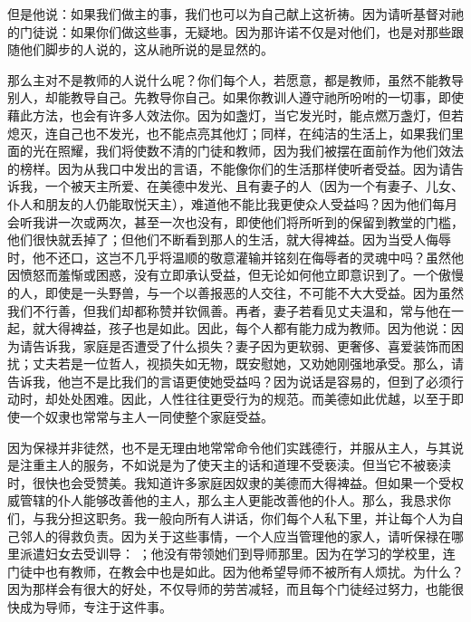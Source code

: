但是他说：如果我们做主的事，我们也可以为自己献上这祈祷。因为请听基督对祂的门徒说：如果你们做这些事，无疑地。因为那许诺不仅是对他们，也是对那些跟随他们脚步的人说的，这从祂所说的是显然的。\par

那么主对不是教师的人说什么呢？你们每个人，若愿意，都是教师，虽然不能教导别人，却能教导自己。先教导你自己。如果你教训人遵守祂所吩咐的一切事，即使藉此方法，也会有许多人效法你。因为如盏灯，当它发光时，能点燃万盏灯，但若熄灭，连自己也不发光，也不能点亮其他灯；同样，在纯洁的生活上，如果我们里面的光在照耀，我们将使数不清的门徒和教师，因为我们被摆在面前作为他们效法的榜样。因为从我口中发出的言语，不能像你们的生活那样使听者受益。因为请告诉我，一个被天主所爱、在美德中发光、且有妻子的人（因为一个有妻子、儿女、仆人和朋友的人仍能取悦天主），难道他不能比我更使众人受益吗？因为他们每月会听我讲一次或两次，甚至一次也没有，即使他们将所听到的保留到教堂的门槛，他们很快就丢掉了；但他们不断看到那人的生活，就大得裨益。因为当受人侮辱时，他不还口，这岂不几乎将温顺的敬意灌输并铭刻在侮辱者的灵魂中吗？虽然他因愤怒而羞惭或困惑，没有立即承认受益，但无论如何他立即意识到了。一个傲慢的人，即使是一头野兽，与一个以善报恶的人交往，不可能不大大受益。因为虽然我们不行善，但我们却都称赞并钦佩善。再者，妻子若看见丈夫温和，常与他在一起，就大得裨益，孩子也是如此。因此，每个人都有能力成为教师。因为他说：因为请告诉我，家庭是否遭受了什么损失？妻子因为更软弱、更奢侈、喜爱装饰而困扰；丈夫若是一位哲人，视损失如无物，既安慰她，又劝她刚强地承受。那么，请告诉我，他岂不是比我们的言语更使她受益吗？因为说话是容易的，但到了必须行动时，却处处困难。因此，人性往往更受行为的规范。而美德如此优越，以至于即使一个奴隶也常常与主人一同使整个家庭受益。\par

因为保禄并非徒然，也不是无理由地常常命令他们实践德行，并服从主人，与其说是注重主人的服务，不如说是为了使天主的话和道理不受亵渎。但当它不被亵渎时，很快也会受赞美。我知道许多家庭因奴隶的美德而大得裨益。但如果一个受权威管辖的仆人能够改善他的主人，那么主人更能改善他的仆人。那么，我恳求你们，与我分担这职务。我一般向所有人讲话，你们每个人私下里，并让每个人为自己邻人的得救负责。因为关于这些事情，一个人应当管理他的家人，请听保禄在哪里派遣妇女去受训导： ；他没有带领她们到导师那里。因为在学习的学校里，连门徒中也有教师，在教会中也是如此。因为他希望导师不被所有人烦扰。为什么？因为那样会有很大的好处，不仅导师的劳苦减轻，而且每个门徒经过努力，也能很快成为导师，专注于这件事。\par

